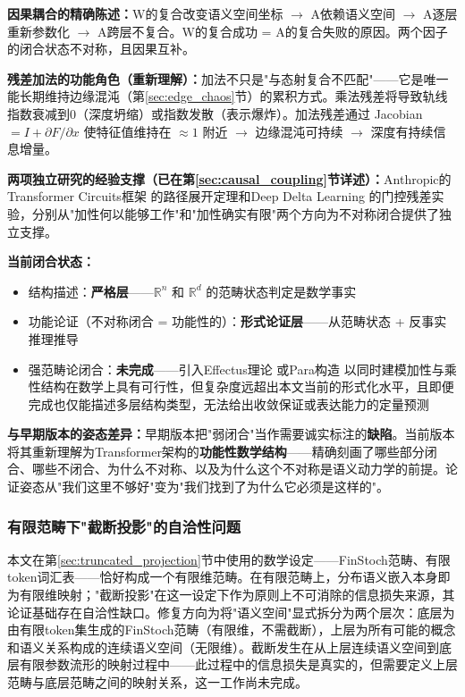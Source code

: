 \documentclass[11pt,a4paper]{article}
\theoremstyle{definition}
\begin{document}
\textbf{因果耦合的精确陈述：}W的复合改变语义空间坐标 $\to$ A依赖语义空间 $\to$ A逐层重新参数化 $\to$ A跨层不复合。W的复合成功 = A的复合失败的原因。两个因子的闭合状态不对称，且因果互补。

\textbf{残差加法的功能角色（重新理解）：}加法不只是"与态射复合不匹配"——它是唯一能长期维持边缘混沌（第\ref{sec:edge_chaos}节）的累积方式。乘法残差将导致轨线指数衰减到0（深度坍缩）或指数发散（表示爆炸）。加法残差通过 Jacobian $= I + \partial F/\partial x$ 使特征值维持在 $\approx 1$ 附近 $\to$ 边缘混沌可持续 $\to$ 深度有持续信息增量。

\textbf{两项独立研究的经验支撑（已在第\ref{sec:causal_coupling}节详述）：}Anthropic的Transformer Circuits框架 \cite{elhage2022transformer_circuits} 的路径展开定理和Deep Delta Learning \cite{zhang2025deep_delta} 的门控残差实验，分别从"加性何以能够工作"和"加性确实有限"两个方向为不对称闭合提供了独立支撑。

\textbf{当前闭合状态：}
\begin{itemize}[leftmargin=*,itemsep=0.2em]
    \item 结构描述：\textbf{严格层}——$\mathbb{R}^n$ 和 $\mathbb{R}^d$ 的范畴状态判定是数学事实
    \item 功能论证（不对称闭合 = 功能性的）：\textbf{形式论证层}——从范畴状态 + 反事实推理推导
    \item 强范畴论闭合：\textbf{未完成}——引入Effectus理论 \cite{cho2015effectus} 或Para构造 \cite{fong2019para} 以同时建模加性与乘性结构在数学上具有可行性，但复杂度远超出本文当前的形式化水平，且即便完成也仅能描述多层结构类型，无法给出收敛保证或表达能力的定量预测
\end{itemize}

\textbf{与早期版本的姿态差异：}早期版本把"弱闭合"当作需要诚实标注的\textbf{缺陷}。当前版本将其重新理解为Transformer架构的\textbf{功能性数学结构}——精确刻画了哪些部分闭合、哪些不闭合、为什么不对称、以及为什么这个不对称是语义动力学的前提。论证姿态从"我们这里不够好"变为"我们找到了为什么它必须是这样的"。

\subsubsection{有限范畴下"截断投影"的自洽性问题}

本文在第\ref{sec:truncated_projection}节中使用的数学设定——FinStoch范畴、有限token词汇表——恰好构成一个有限维范畴。在有限范畴上，分布语义嵌入本身即为有限维映射；"截断投影"在这一设定下作为原则上不可消除的信息损失来源，其论证基础存在自洽性缺口。修复方向为将"语义空间"显式拆分为两个层次：底层为由有限token集生成的FinStoch范畴（有限维，不需截断），上层为所有可能的概念和语义关系构成的连续语义空间（无限维）。截断发生在从上层连续语义空间到底层有限参数流形的映射过程中——此过程中的信息损失是真实的，但需要定义上层范畴与底层范畴之间的映射关系，这一工作尚未完成。
\end{document}
